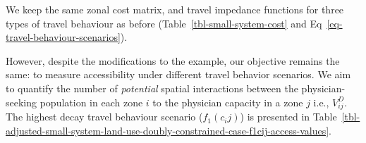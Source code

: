 \documentclass[
  10pt,
  letterpaper,
]{article}
\begin{document}
We keep the same zonal cost matrix, and travel impedance functions for
three types of travel behaviour as before
(Table~\ref{tbl-small-system-cost} and
Eq~\ref{eq-travel-behaviour-scenarios}).

\begin{table}

\caption{\label{tbl-small-system-land-use-doubly-constrained-case}Modified
simple system with three zones reflecting matched population and
opportunities. Population is in 10,000 persons and opportunities in
10,000 of physician-capacity.}


\end{table}%

However, despite the modifications to the example, our objective remains
the same: to measure accessibility under different travel behavior
scenarios. We aim to quantify the number of \emph{potential} spatial
interactions between the physician-seeking population in each zone \(i\)
to the physician capacity in a zone \(j\) i.e., \(V_{ij}^D\). The
highest decay travel behaviour scenario (\(f_1(c_ij)\)) is presented in
Table~\ref{tbl-adjusted-small-system-land-use-doubly-constrained-case-f1cij-access-values}.

\begin{table}

\caption{\label{tbl-adjusted-small-system-land-use-doubly-constrained-case-f1cij-access-values}Doubly
constrained accessible opportunities assuming highest travel decay in
the modified simple system.}


\end{table}%
\end{document}
